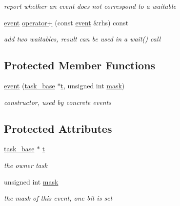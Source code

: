 \begin{DoxyCompactItemize}
\begin{DoxyCompactList}\small\item\em report whether an event does not correspond to a waitable \end{DoxyCompactList}\item 
\hyperlink{classrtos_1_1event}{event} \hyperlink{classrtos_1_1event_af75155ce72b01bd2927a411643ddae89}{operator+} (const \hyperlink{classrtos_1_1event}{event} \&rhs) const 
\begin{DoxyCompactList}\small\item\em add two waitables, result can be used in a wait() call \end{DoxyCompactList}\end{DoxyCompactItemize}
\subsection*{Protected Member Functions}
\begin{DoxyCompactItemize}
\item 
\hyperlink{classrtos_1_1event_a6cbf4e72e1d4ab312b3901ed54f4d48e}{event} (\hyperlink{classrtos_1_1task__base}{task\+\_\+base} $\ast$\hyperlink{classrtos_1_1event_aa83745aabc941145f00386fd63f6b557}{t}, unsigned int \hyperlink{classrtos_1_1event_aa6e6f66f74b4f1523e456d34dd7a1704}{mask})\hypertarget{classrtos_1_1event_a6cbf4e72e1d4ab312b3901ed54f4d48e}{}\label{classrtos_1_1event_a6cbf4e72e1d4ab312b3901ed54f4d48e}

\begin{DoxyCompactList}\small\item\em constructor, used by concrete events \end{DoxyCompactList}\end{DoxyCompactItemize}
\subsection*{Protected Attributes}
\begin{DoxyCompactItemize}
\item 
\hyperlink{classrtos_1_1task__base}{task\+\_\+base} $\ast$ \hyperlink{classrtos_1_1event_aa83745aabc941145f00386fd63f6b557}{t}\hypertarget{classrtos_1_1event_aa83745aabc941145f00386fd63f6b557}{}\label{classrtos_1_1event_aa83745aabc941145f00386fd63f6b557}

\begin{DoxyCompactList}\small\item\em the owner task \end{DoxyCompactList}\item 
unsigned int \hyperlink{classrtos_1_1event_aa6e6f66f74b4f1523e456d34dd7a1704}{mask}
\begin{DoxyCompactList}\small\item\em the mask of this event, one bit is set \end{DoxyCompactList}\end{DoxyCompactItemize}
